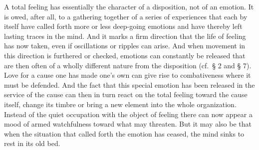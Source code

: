 \documentclass[12pt]{book}
\newcommand{\opage}[1]{\marginnote{\footnotesize\textit{[#1]}}}
\begin{document}
A total feeling has essentially the character of a disposition, not of an emotion. It is
owed, after all, to a gathering together of a series of experiences that each by itself
have called forth more or less deep-going emotions and have thereby left lasting traces in
the mind. And it marks a firm direction that the life of feeling has now taken, even if
oscillations or ripples can arise. And when movement in this direction is furthered or
checked, emotions can constantly be released that are then often of a wholly different
nature from the disposition (cf.\ § 2 and § 7). Love for a cause one has made one's own can
give rise to combativeness where it must be defended. And the fact that this special emotion
has been released in the service of the cause can then in turn react on the total feeling
toward the cause itself, change its timbre or bring a new element into the whole
organization. Instead of the quiet occupation with the object of feeling \opage{129}there
can now appear a mood of armed watchfulness toward what may threaten. But it may also be
that when the situation that called forth the emotion has ceased, the mind sinks to rest in
its old bed.
\end{document}
